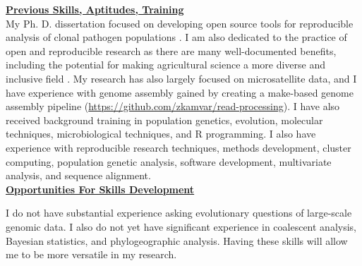 \documentclass[12pt,letterpaper]{article}
\begin{document}
\noindent \textbf{\underline{Previous Skills, Aptitudes, Training}}\\

My Ph. D. dissertation focused on developing open source tools for reproducible analysis of clonal pathogen populations \citep{kamvar2014poppr}. 
I am also dedicated to the practice of open and reproducible research as there are many well-documented benefits, including the potential for making agricultural science a more diverse and inclusive field \citep{whitaker2017publishing,boettiger2015introduction}. 
My research has also largely focused on microsatellite data, and I have experience with genome assembly gained by creating a make-based genome assembly pipeline (\url{https://github.com/zkamvar/read-processing}). 
I have also received background training in population genetics, evolution, molecular techniques, microbiological techniques, and R programming. 
I also have experience with reproducible research techniques, methods development, cluster computing, population genetic analysis, software development, multivariate analysis, and sequence alignment. \\

\noindent \textbf{\underline{Opportunities For Skills Development}}

I do not have substantial experience asking evolutionary questions of large-scale genomic data. 
I also do not yet have significant experience in coalescent analysis, Bayesian statistics, and phylogeographic analysis.
Having these skills will allow me to be more versatile in my research.\\



\end{document}
